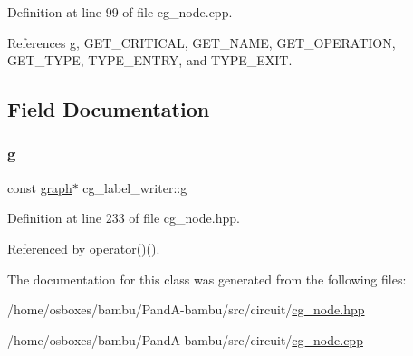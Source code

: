 Definition at line 99 of file cg\+\_\+node.\+cpp.



References g, G\+E\+T\+\_\+\+C\+R\+I\+T\+I\+C\+AL, G\+E\+T\+\_\+\+N\+A\+ME, G\+E\+T\+\_\+\+O\+P\+E\+R\+A\+T\+I\+ON, G\+E\+T\+\_\+\+T\+Y\+PE, T\+Y\+P\+E\+\_\+\+E\+N\+T\+RY, and T\+Y\+P\+E\+\_\+\+E\+X\+IT.



\subsection{Field Documentation}
\mbox{\label{classcg__label__writer_ace4a7f6afc10a312282534f0f3c4005f}} 
\subsubsection{\texorpdfstring{g}{g}}
{\footnotesize\ttfamily const \hyperlink{structgraph}{graph}$\ast$ cg\+\_\+label\+\_\+writer\+::g\hspace{0.3cm}{\ttfamily [private]}}



Definition at line 233 of file cg\+\_\+node.\+hpp.



Referenced by operator()().



The documentation for this class was generated from the following files\+:\begin{DoxyCompactItemize}
\item 
/home/osboxes/bambu/\+Pand\+A-\/bambu/src/circuit/\hyperlink{cg__node_8hpp}{cg\+\_\+node.\+hpp}\item 
/home/osboxes/bambu/\+Pand\+A-\/bambu/src/circuit/\hyperlink{cg__node_8cpp}{cg\+\_\+node.\+cpp}\end{DoxyCompactItemize}
